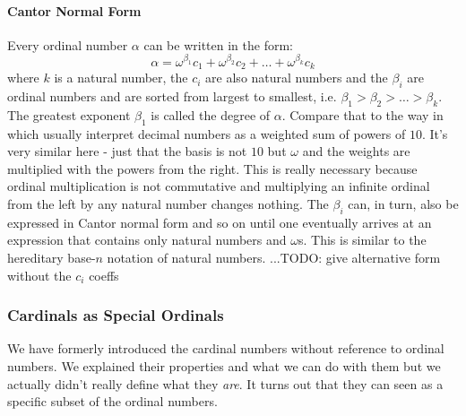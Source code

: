 

\paragraph{Cantor Normal Form}
Every ordinal number $\alpha$ can be written in the form:
\begin{equation}
\alpha = \omega^{\beta_1} c_1 + \omega^{\beta_2} c_2 + \ldots + \omega^{\beta_k} c_k
\end{equation}
where $k$ is a natural number, the $c_i$ are also natural numbers and the $\beta_i$ are ordinal numbers and are sorted from largest to smallest, i.e. $\beta_1 > \beta_2 > \ldots > \beta_k$. The greatest exponent $\beta_1$ is called the degree of $\alpha$. Compare that to the way in which usually interpret decimal numbers as a weighted sum of powers of $10$. It's very similar here - just that the basis is not $10$ but $\omega$ and the weights are multiplied with the powers from the right. This is really necessary because ordinal multiplication is not commutative and multiplying an infinite ordinal from the left by any natural number changes nothing. The $\beta_i$ can, in turn, also be expressed in Cantor normal form and so on until one eventually arrives at an expression that contains only natural numbers and $\omega$s. This is similar to the hereditary base-$n$ notation of natural numbers. ...TODO: give alternative form without the $c_i$ coeffs





\subsubsection{Cardinals as Special Ordinals}
We have formerly introduced the cardinal numbers without reference to ordinal numbers. We explained their properties and what we can do with them but we actually didn't really define what they \emph{are}. It turns out that they can seen as a specific subset of the ordinal numbers.


